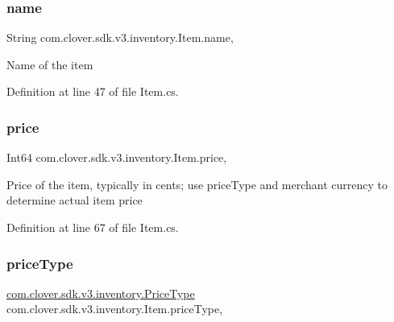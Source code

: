 \subsubsection{\texorpdfstring{name}{name}}
{\footnotesize\ttfamily String com.\+clover.\+sdk.\+v3.\+inventory.\+Item.\+name\hspace{0.3cm}{\ttfamily [get]}, {\ttfamily [set]}}



Name of the item 



Definition at line 47 of file Item.\+cs.

\mbox{\label{classcom_1_1clover_1_1sdk_1_1v3_1_1inventory_1_1_item_a76cae4be53be49e7205dcb7427eb5d13}} 
\subsubsection{\texorpdfstring{price}{price}}
{\footnotesize\ttfamily Int64 com.\+clover.\+sdk.\+v3.\+inventory.\+Item.\+price\hspace{0.3cm}{\ttfamily [get]}, {\ttfamily [set]}}



Price of the item, typically in cents; use price\+Type and merchant currency to determine actual item price 



Definition at line 67 of file Item.\+cs.

\mbox{\label{classcom_1_1clover_1_1sdk_1_1v3_1_1inventory_1_1_item_ac63cf057404352aa1897a353206fcdb2}} 
\subsubsection{\texorpdfstring{price\+Type}{priceType}}
{\footnotesize\ttfamily \hyperlink{namespacecom_1_1clover_1_1sdk_1_1v3_1_1inventory_a29563083c5ea6797e6ce5b3f5a1d2f12}{com.\+clover.\+sdk.\+v3.\+inventory.\+Price\+Type} com.\+clover.\+sdk.\+v3.\+inventory.\+Item.\+price\+Type\hspace{0.3cm}{\ttfamily [get]}, {\ttfamily [set]}}



